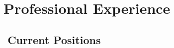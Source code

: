 \documentclass[10pt, a4paper, english]{cv_public}
\begin{document}

\vspace{10pt}
\section*{\faBriefcase \ Professional Experience}


\subsection*{\faBuilding\ \ Current Positions \ }
\end{document}
